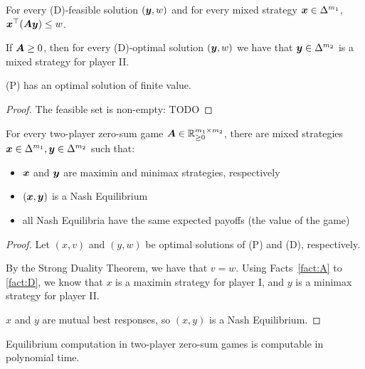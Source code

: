 \begin{fact}
	\label{fact:C}
	For every (D)-feasible solution $(\bm{y}, w)$ and for every mixed
	strategy $\bm{x} \in \Delta^{m_1}$, $\bm{x}^\top(\bm{A} \bm{y}) \le
	w$.
\end{fact}

\begin{fact}
	\label{fact:D}
	If $\bm{A} \ge 0$, then for every (D)-optimal solution $(\bm{y}, w)$ we
	have that $\bm{y} \in \Delta^{m_2}$ is a mixed strategy for player II.
\end{fact}

\begin{fact}
	(P) has an optimal solution of finite value.
\end{fact}

\begin{proof}
	The feasible set is non-empty: TODO
\end{proof}

\begin{theorem}
	For every two-player zero-sum game $\bm{A} \in \mathbb{R}^{m_1 \times
	m_2}_{\ge 0}$, there are mixed strategies $\bm{x} \in \Delta^{m_1},
	\bm{y} \in \Delta^{m_2}$ such that:

	\begin{itemize}
		\item $\bm{x}$ and $\bm{y}$ are maximin and minimax strategies,
			respectively
		\item $(\bm{x}, \bm{y})$ is a Nash Equilibrium
		\item all Nash Equilibria have the same expected payoffs (the
			\textnormal{value} of the game)
	\end{itemize}
\end{theorem}

\begin{proof}
	Let $(x, v)$ and $(y, w)$ be optimal solutions of (P) and (D),
	respectively.

	By the Strong Duality Theorem, we have that $v = w$. Using
	Facts~\ref{fact:A} to \ref{fact:D}, we know that $x$ is a maximin strategy
	for player I, and $y$ is a minimax strategy for player II.

	$x$ and $y$ are mutual best responses, so $(x,y)$ is a Nash Equilibrium.
\end{proof}

\begin{corollary}
	Equilibrium computation in two-player zero-sum games is computable in
	polynomial time.
\end{corollary}
